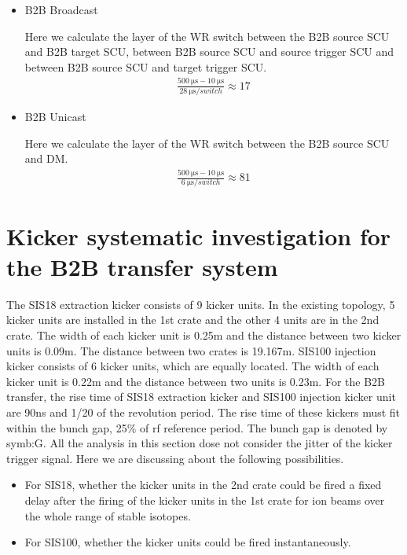 \begin{itemize}
    \item B2B Broadcast

		Here we calculate the layer of the WR switch between the B2B source \gls{SCU} and B2B target SCU, between B2B source SCU 			and source trigger SCU and between B2B source SCU and target trigger SCU.  
		\begin{equation}
		\begin{aligned}
			\frac{\SI{500}{\us}-\SI{10}{\us}}{\SI{28}{\us/switch}}\approx 17
		\label {num_switch_b}
		\end{aligned}
		\end{equation}
	\item B2B Unicast

		Here we calculate the layer of the WR switch between the B2B source SCU and DM.
		\begin{equation}
		\begin{aligned}
			\frac{\SI{500}{\us}-\SI{10}{\us}}{\SI{6}{\us/switch}}\approx 81
		\label {num_switch_b}
		\end{aligned}
		\end{equation}
\end{itemize}

\section{Kicker systematic investigation for the B2B transfer system}
The SIS18 extraction kicker consists of 9 kicker units. In the existing topology, 5 kicker units are installed in the 1st crate and the other 4 units are in the 2nd crate. The width of each kicker unit is 0.25m and the distance between two kicker units is 0.09m. The distance between two crates is 19.167m. SIS100 injection kicker consists of 6 kicker units, which are equally located. The width of each kicker unit is 0.22m and the distance between two units is 0.23m. For the B2B transfer, the rise time of SIS18 extraction kicker and SIS100 injection kicker unit are 90ns and 1/20 of the revolution period. The rise time of these kickers must fit within the bunch gap, 25$\%$ of rf reference period. The bunch gap is denoted by \gls{symb:G}. All the analysis in this section dose not consider the jitter of the kicker trigger signal. Here we are discussing about the following possibilities. 
\begin{itemize}
    \item For SIS18, whether the kicker units in the 2nd crate could be fired a fixed delay after the firing of the kicker units in the 1st crate for ion beams over the whole range of stable isotopes. 
    \item For SIS100, whether the kicker units could be fired instantaneously. 
\end{itemize} 

